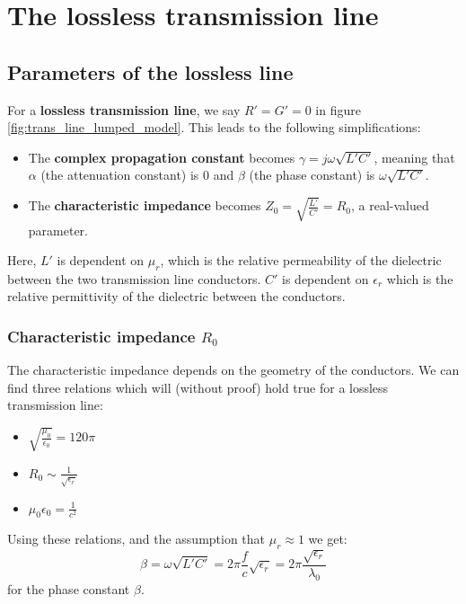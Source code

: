 \documentclass[../transmission.tex]{subfiles}
\begin{document}
	\section{The lossless transmission line}
		\subsection{Parameters of the lossless line}
			For a \textbf{lossless transmission line}, we say $R' = G' = 0$ in figure \ref{fig:trans_line_lumped_model}. This leads to the following simplifications:
			\begin{itemize}
				\item The \textbf{complex propagation constant} becomes $\gamma = j\omega\sqrt{L'C'}$, meaning that $\alpha$ (the attenuation constant) is 0 and $\beta$ (the phase constant) is $\omega\sqrt{L'C'}$.
				\item The \textbf{characteristic impedance} becomes $Z_0 = \sqrt{\frac{L'}{C'}}=R_0$, a real-valued parameter.
			\end{itemize}
			Here, $L'$ is dependent on $\mu_r$, which is the relative permeability of the dielectric between the two transmission line conductors. $C'$ is dependent on $\epsilon_r$ which is the relative permittivity of the dielectric between the conductors.
			\subsubsection{Characteristic impedance $R_0$}
				The characteristic impedance depends on the geometry of the conductors. We can find three relations which will (without proof) hold true for a lossless transmission line:
				\begin{itemize}
					\item $\sqrt{\frac{\mu_0}{\epsilon_0}}=120\pi$
					\item $R_0\sim \frac{1}{\sqrt{\epsilon_r}}$
					\item $\mu_0\epsilon_0=\frac{1}{c^2}$
				\end{itemize}
				Using these relations, and the assumption that $\mu_r\approx1$ we get:
				\begin{equation}
					\beta = \omega\sqrt{L'C'}=2\pi\frac{f}{c}\sqrt{\epsilon_r}=2\pi\frac{\sqrt{\epsilon_r}}{\lambda_0}
				\end{equation}
				for the phase constant $\beta$.
		
\end{document}
